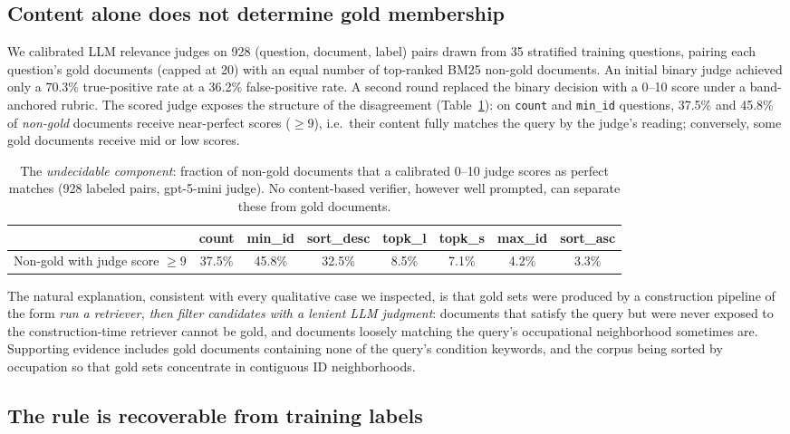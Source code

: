 \documentclass[11pt]{article}
\begin{document}
\subsection{Content alone does not determine gold membership}

We calibrated LLM relevance judges on 928 (question, document, label) pairs drawn from 35 stratified training questions, pairing each question's gold documents (capped at 20) with an equal number of top-ranked BM25 non-gold documents. An initial binary judge achieved only a 70.3\% true-positive rate at a 36.2\% false-positive rate. A second round replaced the binary decision with a 0--10 score under a band-anchored rubric. The scored judge exposes the structure of the disagreement (Table~\ref{tab:undecidable}): on \texttt{count} and \texttt{min\_id} questions, 37.5\% and 45.8\% of \emph{non-gold} documents receive near-perfect scores ($\geq 9$), i.e.\ their content fully matches the query by the judge's reading; conversely, some gold documents receive mid or low scores.

\begin{table}[h]
\centering
\begin{tabular}{lccccccc}
\toprule
 & count & min\_id & sort\_desc & topk\_l & topk\_s & max\_id & sort\_asc\\
\midrule
Non-gold with judge score $\geq 9$ & 37.5\% & 45.8\% & 32.5\% & 8.5\% & 7.1\% & 4.2\% & 3.3\%\\
\bottomrule
\end{tabular}
\caption{The \emph{undecidable component}: fraction of non-gold documents that a calibrated 0--10 judge scores as perfect matches (928 labeled pairs, gpt-5-mini judge). No content-based verifier, however well prompted, can separate these from gold documents.}
\label{tab:undecidable}
\end{table}

The natural explanation, consistent with every qualitative case we inspected, is that gold sets were produced by a construction pipeline of the form \emph{run a retriever, then filter candidates with a lenient LLM judgment}: documents that satisfy the query but were never exposed to the construction-time retriever cannot be gold, and documents loosely matching the query's occupational neighborhood sometimes are. Supporting evidence includes gold documents containing none of the query's condition keywords, and the corpus being sorted by occupation so that gold sets concentrate in contiguous ID neighborhoods.

\subsection{The rule is recoverable from training labels}
\end{document}
